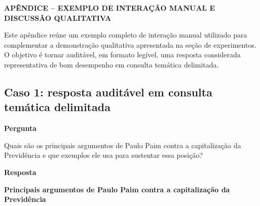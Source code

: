 \clearpage
{}
{}
\begin{center}
\textbf{APÊNDICE  -- EXEMPLO DE INTERAÇÃO MANUAL E DISCUSSÃO QUALITATIVA}
\end{center}
\label{sec:apendice-interacao}

Este apêndice reúne um exemplo completo de interação manual utilizado para complementar a demonstração qualitativa apresentada na seção de experimentos. O objetivo é tornar auditável, em formato legível, uma resposta considerada representativa de bom desempenho em consulta temática delimitada.

\subsection{Caso 1: resposta auditável em consulta temática delimitada}\label{sec:anexo-caso-bom}

\textbf{Pergunta}

Quais são os principais argumentos de Paulo Paim contra a capitalização da Previdência e que exemplos ele usa para sustentar essa posição?

\textbf{Resposta}

\textbf{Principais argumentos de Paulo Paim contra a capitalização da Previdência}

